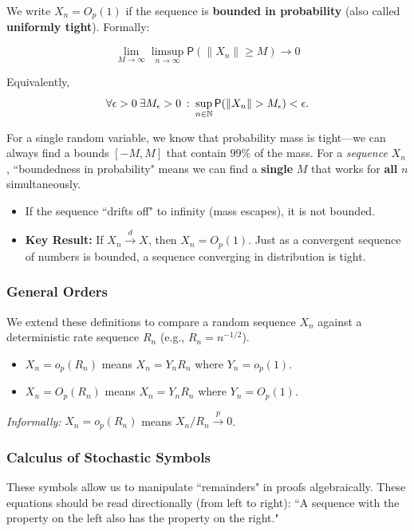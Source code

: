 \begin{definition}
We write $X_n = O_p(1)$ if the sequence is \textbf{bounded in probability} (also called \textbf{uniformly tight}). Formally:

\[
    \lim\limits_{M \to \infty} \limsup\limits_{n \to \infty} \mathsf{P}(\|X_{n}\|\ge M) \longrightarrow 0 
\]

Equivalently, 
\[\forall \epsilon > 0 \: \exists M_{\epsilon}>0 \: : \: \sup_{n \in \mathbb{N}} \mathsf{P}(\|X_n\| > M_\epsilon) < \epsilon. \]
\end{definition}



For a single random variable, we know that probability mass is tight—we can always find a bounds $[-M, M]$ that contain $99\%$ of the mass.
For a \textit{sequence} $X_n$, ``boundedness in probability" means we can find a \textbf{single} $M$ that works for \textbf{all} $n$ simultaneously.
\begin{itemize}
    \item If the sequence ``drifts off" to infinity (mass escapes), it is not bounded.
    \item \textbf{Key Result:} If $X_n \xrightarrow{d} X$, then $X_n = O_p(1)$. Just as a convergent sequence of numbers is bounded, a sequence converging in distribution is tight.
\end{itemize}

\subsubsection{General Orders}

We extend these definitions to compare a random sequence $X_n$ against a deterministic rate sequence $R_n$ (e.g., $R_n = n^{-1/2}$).

\begin{itemize}
    \item $X_n = o_p(R_n)$ means $X_n = Y_n R_n$ where $Y_n = o_p(1)$.
    \item $X_n = O_p(R_n)$ means $X_n = Y_n R_n$ where $Y_n = O_p(1)$.
\end{itemize}
\textit{Informally:} $X_n = o_p(R_n)$ means $X_n / R_n \xrightarrow{p} 0$.

\subsubsection{Calculus of Stochastic Symbols}

These symbols allow us to manipulate ``remainders" in proofs algebraically. These equations should be read directionally (from left to right): ``A sequence with the property on the left also has the property on the right."

